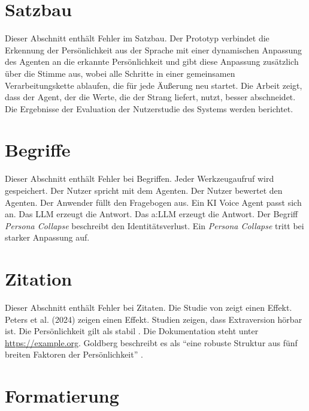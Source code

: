 \section{Satzbau}
\label{sec:satz}

Dieser Abschnitt enthält Fehler im Satzbau.
Der Prototyp verbindet die Erkennung der Persönlichkeit aus der Sprache mit einer dynamischen Anpassung des Agenten an die erkannte Persönlichkeit und gibt diese Anpassung zusätzlich über die Stimme aus, wobei alle Schritte in einer gemeinsamen Verarbeitungskette ablaufen, die für jede Äußerung neu startet. %
Die Arbeit zeigt, dass der Agent, der die Werte, die der Strang liefert, nutzt, besser abschneidet. %
Die Ergebnisse der Evaluation der Nutzerstudie des Systems werden berichtet. %

\section{Begriffe}
\label{sec:begriffe}

Dieser Abschnitt enthält Fehler bei Begriffen.
Jeder Werkzeugaufruf wird gespeichert. %
Der Nutzer spricht mit dem Agenten.
Der Nutzer bewertet den Agenten.
Der Anwender füllt den Fragebogen aus. %
Ein KI Voice Agent passt sich an. %
Das LLM erzeugt die Antwort. %
Das \gls{a:LLM} erzeugt die Antwort.
Der Begriff \emph{Persona Collapse} beschreibt den Identitätsverlust.
Ein \emph{Persona Collapse} tritt bei starker Anpassung auf. %

\section{Zitation}
\label{sec:zitation}

Dieser Abschnitt enthält Fehler bei Zitaten.
Die Studie von \textcite{unbekannt2020} zeigt einen Effekt. %
Peters et al. (2024) zeigen einen Effekt. %
Studien zeigen, dass Extraversion hörbar ist. %
Die Persönlichkeit gilt als stabil \cite{goldberg1990}. %
Die Dokumentation steht unter \url{https://example.org}. %
Goldberg beschreibt es als \enquote{eine robuste Struktur aus fünf breiten Faktoren der Persönlichkeit} \parencite{goldberg1990}. %

\section{Formatierung}
\label{sec:format}

